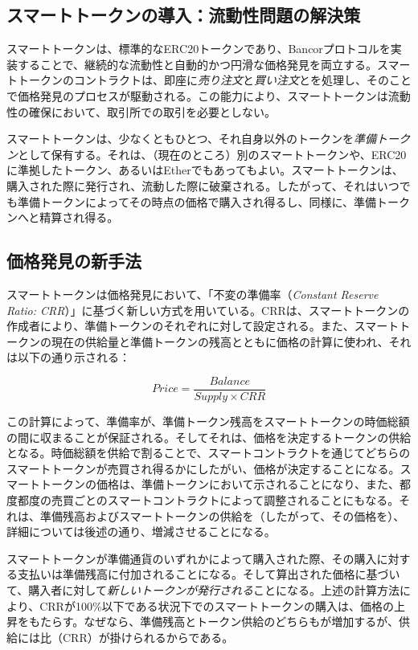 \documentclass{jsarticle}
\begin{document}
  \subsection{スマートトークンの導入：流動性問題の解決策}

  スマートトークンは、標準的なERC20トークンであり、Bancorプロトコルを実装することで、継続的な流動性と自動的かつ円滑な価格発見を両立する。スマートトークンのコントラクトは、即座に\emph{売り注文}と\emph{買い注文}とを処理し、そのことで価格発見のプロセスが駆動される。この能力により、スマートトークンは流動性の確保において、取引所での取引を必要としない。

  スマートトークンは、少なくともひとつ、それ自身以外のトークンを\emph{準備トークン}として保有する。それは、（現在のところ）別のスマートトークンや、ERC20に準拠したトークン、あるいはEtherでもあってもよい。スマートトークンは、購入された際に発行され、流動した際に破棄される。したがって、それはいつでも準備トークンによってその時点の価格で購入され得るし、同様に、準備トークンへと精算され得る。

  \subsection{価格発見の新手法}

  スマートトークンは価格発見において、「不変の準備率（\textit{Constant Reserve Ratio: CRR}）」に基づく新しい方式を用いている。CRRは、スマートトークンの作成者により、準備トークンのそれぞれに対して設定される。また、スマートトークンの現在の供給量と準備トークンの残高とともに価格の計算に使われ、それは以下の通り示される：

  \begin{equation*} \label{eq:price-discovery-formula}
    Price = \frac{Balance}{Supply \times CRR}
  \end{equation*}

  この計算によって、準備率が、準備トークン残高をスマートトークンの時価総額の間に収まることが保証される。そしてそれは、価格を決定するトークンの供給となる。時価総額を供給で割ることで、スマートコントラクトを通じてどちらのスマートトークンが売買され得るかにしたがい、価格が決定することになる。スマートトークンの価格は、準備トークンにおいて示されることになり、また、都度都度の売買ごとのスマートコントラクトによって調整されることにもなる。それは、準備残高およびスマートトークンの供給を（したがって、その価格を）、詳細については後述の通り、増減させることになる。

  スマートトークンが準備通貨のいずれかによって購入された際、その購入に対する支払いは準備残高に付加されることになる。そして算出された価格に基づいて、購入者に対して\emph{新しいトークンが発行される}ことになる。上述の計算方法により、CRRが100\%以下である状況下でのスマートトークンの購入は、価格の上昇をもたらす。なぜなら、準備残高とトークン供給のどちらもが増加するが、供給には比（CRR）が掛けられるからである。
\end{document}
